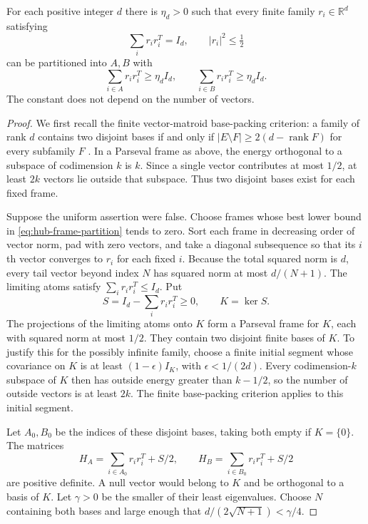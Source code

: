 \begin{lemma}
\label{lem:hub-frame-partition}
For each positive integer $d$ there is $\eta_d>0$ such that every
finite family $r_i\in\mathbb R^d$ satisfying
\[
 \sum_i r_i r_i^T=I_d,\qquad |r_i|^2\le\tfrac12
\]
can be partitioned into $A,B$ with
\begin{equation}\label{eq:hub-frame-partition}
 \sum_{i\in A}r_i r_i^T\ge\eta_d I_d,
 \qquad
 \sum_{i\in B}r_i r_i^T\ge\eta_d I_d.
\end{equation}
The constant does not depend on the number of vectors.
\end{lemma}

\begin{proof}
We first recall the finite vector-matroid base-packing criterion:
a family of rank $d$ contains two disjoint bases if and only if
$|E\setminus F|\ge2(d-\operatorname{rank}F)$ for every subfamily $F$
\citep{Edmonds1965}.  In a Parseval frame as above, the energy
orthogonal to a subspace of codimension $k$ is $k$.
Since a single vector contributes at most $1/2$, at least $2k$
vectors lie outside that subspace.  Thus two disjoint bases exist
for each fixed frame.

Suppose the uniform assertion were false.  Choose frames whose best
lower bound in \eqref{eq:hub-frame-partition} tends to zero.
Sort each frame in decreasing order of vector norm, pad with zero
vectors, and take a diagonal subsequence so that its $i$th vector
converges to $r_i$ for each fixed $i$.
Because the total squared norm is $d$, every tail vector beyond
index $N$ has squared norm at most $d/(N+1)$.
The limiting atoms satisfy $\sum_i r_i r_i^T\le I_d$.
Put
\[
 S=I_d-\sum_i r_i r_i^T\ge0,\qquad K=\ker S.
\]
The projections of the limiting atoms onto $K$ form a Parseval frame
for $K$, each with squared norm at most $1/2$.
They contain two disjoint finite bases of $K$.
To justify this for the possibly infinite family, choose a finite
initial segment whose covariance on $K$ is at least
$(1-\epsilon)I_K$, with $\epsilon<1/(2d)$.
Every codimension-$k$ subspace of $K$ then has outside energy greater
than $k-1/2$, so the number of outside vectors is at least $2k$.
The finite base-packing criterion applies to this initial segment.

Let $A_0,B_0$ be the indices of these disjoint bases, taking both
empty if $K=\{0\}$.  The matrices
\[
 H_A=\sum_{i\in A_0}r_i r_i^T+S/2,
 \qquad
 H_B=\sum_{i\in B_0}r_i r_i^T+S/2
\]
are positive definite.  A null vector would belong to $K$ and be
orthogonal to a basis of $K$.  Let $\gamma>0$ be the smaller of their
least eigenvalues.  Choose $N$ containing both bases and large enough
that $d/(2\sqrt{N+1})<\gamma/4$.


\end{proof}
